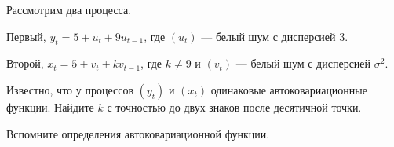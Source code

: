 
\begin{question}
Рассмотрим два процесса.

Первый, \(y_t = 5 + u_t + 9 u_{t-1}\), где \((u_t)\) --- белый шум с дисперсией \(3\).

Второй, \(x_t = 5 + v_t + k v_{t-1}\), где \(k\neq 9\) и \((v_t)\) --- белый шум с дисперсией \(\sigma^2\).

Известно, что у процессов \((y_t)\) и \((x_t)\) одинаковые автоковариационные функции.
Найдите \(k\) с точностью до двух знаков после десятичной точки.
\end{question}

\begin{solution}
Вспомните определения автоковариационной функции.
\end{solution}

